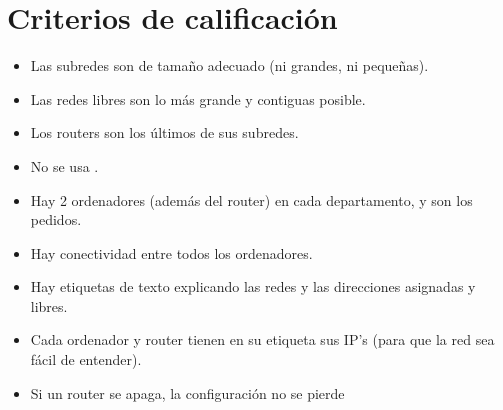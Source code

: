 \section{Criterios de calificación}
\begin{itemize}
\item Las subredes son de tamaño adecuado (ni grandes, ni pequeñas).
\item Las redes libres son lo más grande y contiguas posible.
\item Los routers son los últimos de sus subredes.
\item No se usa \texttt{}.
\item Hay 2 ordenadores (además del router) en cada departamento, y son los pedidos.
\item Hay conectividad entre todos los ordenadores.
\item Hay etiquetas de texto explicando las redes y las direcciones asignadas y libres.
\item Cada ordenador y router tienen en su etiqueta sus IP’s (para que la red sea fácil de entender).
\item Si un router se apaga, la configuración no se pierde
\end{itemize}


